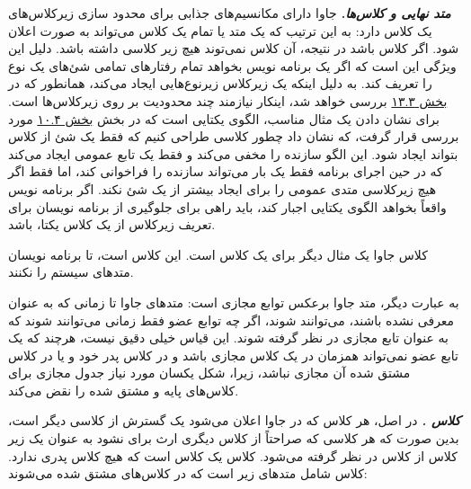 \documentclass[a4paper,12pt]{report}
\newcommand{\lrInlineMono}[1]{{\color{steelBlue}\lr{\texttt{#1}}}}
\begin{document}
	
	\textit{\textbf{
			متد نهایی
			 و کلاس‌ها.}}   جاوا دارای مکانسیم‌های جذابی برای محدود سازی زیرکلاس‌های یک کلاس دارد: به این ترتیب که یک متد یا تمام یک کلاس می‌تواند به صورت 
	  اعلان شود. اگر کلاس 
	   باشد در نتیجه، آن کلاس نمی‌توند هیچ زیر کلاسی داشته باشد. دلیل این ویژگی این است که اگر یک برنامه نویس بخواهد تمام رفتارهای تمامی شئ‌های یک نوع را تعریف کند. به دلیل اینکه یک زیرکلاس زیرنوع‌هایی ایجاد می‌کند، همانطور که در 
	\hyperref[sec3:chap13]{
	بخش ۱۳.۳} بررسی خواهد شد، اینکار نیازمند چند محدودیت بر روی زیرکلاس‌ها است. برای نشان دادن یک مثال مناسب، الگوی یکتایی
	است که در بخش 
	\hyperref[sec4:chap10]{
	بخش ۱۰.۴} مورد بررسی قرار گرفت، که نشان داد چطور کلاسی طراحی کنیم که فقط یک شئ
	از کلاس بتواند ایجاد شود. این الگو سازنده را مخفی می‌کند و فقط یک تابع عمومی ایجاد می‌کند که در حین اجرای برنامه فقط یک بار می‌تواند سازنده را فراخوانی کند، اما فقط اگر هیچ زیرکلاسی متدی عمومی را برای ایجاد بیشتر از یک شئ 
	 نکند.
	اگر برنامه نویس واقعاً بخواهد الگوی یکتایی اجبار کند، باید راهی برای جلوگیری از برنامه نویسان برای تعریف زیرکلاس از یک کلاس یکتا، باشد. 
	
	 کلاس جاوا 
	\lrInlineMono{java.lang.System}
	یک مثال دیگر برای یک کلاس
	 است. این کلاس 
	 است، تا برنامه نویسان متد‌های سیستم را 
	نکنند.
	
	به عبارت دیگر،‌ متد 
	جاوا برعکس توابع مجازی 
	است: متد‌های جاوا تا زمانی که به عنوان 
	معرفی نشده باشند، می‌توانند 
	 شوند، اگر چه توابع عضو 
	 فقط زمانی می‌توانند 
	  شوند که به عنوان تابع مجازی در نظر گرفته شوند.
	 این قیاس خیلی دقیق نیست، هرچند که یک تابع عضو 
	 نمی‌تواند همزمان در یک کلاس مجازی باشد و در کلاس پدر خود و یا در کلاس مشتق شده آن مجازی نباشد، زیرا،   شکل یکسان مورد نیاز جدول مجازی برای کلاس‌های پایه و مشتق شده را نقض می‌کند. 
	
	
	\textit{\textbf{
	کلاس 
	.}} در اصل، هر کلاس که در جاوا اعلان می‌شود یک گسترش
 از کلاسی دیگر است، بدین صورت که هر کلاسی که صراحتاً از کلاس دیگری ارث برای نشود به عنوان یک زیر کلاس از کلاس 
 در نظر گرفته می‌شود.
	کلاس 
	\lrInlineMono{Object}
	یک کلاس است که هیچ کلاس پدری ندارد. کلاس 
	\lrInlineMono{Object}
	شامل متدهای زیر است که در کلاس‌های مشتق شده 
	\lrInlineMono{override}
	می‌شوند:
	
\end{document}
